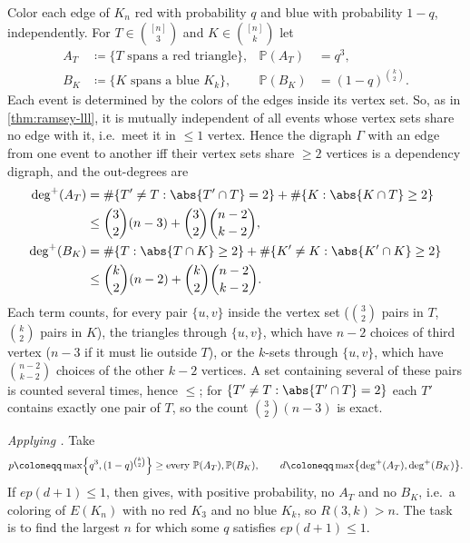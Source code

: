 Color each edge of \(K_{n}\) red with probability \(q\) and blue with probability \(1-q\), independently. For \(T \in \binom{[n]}{3}\) and \(K \in \binom{[n]}{k}\) let
\[
    \begin{aligned}
        A_{T} &\coloneqq \{ T \text{ spans a red triangle} \}, & \mathbb{P}(A_{T}) &= q^{3}, \\
        B_{K} &\coloneqq \{ K \text{ spans a blue } K_{k} \}, & \mathbb{P}(B_{K}) &= (1-q)^{\binom{k}{2}} .
    \end{aligned}
\]
Each event is determined by the colors of the edges inside its vertex set. So, as in \autoref{thm:ramsey-lll}, it is mutually independent of all events whose vertex sets share no edge with it, i.e.\ meet it in \(\le 1\) vertex. Hence the digraph \(\Gamma\) with an edge from one event to another iff their vertex sets share \(\ge 2\) vertices is a dependency digraph, and the out-degrees are
\[
    \begin{aligned}
        \deg^{+}(A_{T}) &= \# \{ T' \ne T : \abs{T' \cap T} = 2 \} + \# \{ K : \abs{K \cap T} \ge 2 \} \\
        &\le \binom{3}{2} (n-3) + \binom{3}{2} \binom{n-2}{k-2}, \\
        \deg^{+}(B_{K}) &= \# \{ T : \abs{T \cap K} \ge 2 \} + \# \{ K' \ne K : \abs{K' \cap K} \ge 2 \} \\
        &\le \binom{k}{2} (n-2) + \binom{k}{2} \binom{n-2}{k-2} .
    \end{aligned}
\]
Each term counts, for every pair \(\{u, v\}\) inside the vertex set (\(\binom{3}{2}\) pairs in \(T\), \(\binom{k}{2}\) pairs in \(K\)), the triangles through \(\{u, v\}\), which have \(n-2\) choices of third vertex (\(n-3\) if it must lie outside \(T\)), or the \(k\)-sets through \(\{u, v\}\), which have \(\binom{n-2}{k-2}\) choices of the other \(k-2\) vertices. A set containing several of these pairs is counted several times, hence \(\le\); for \(\{ T' \ne T : \abs{T' \cap T} = 2 \}\) each \(T'\) contains exactly one pair of \(T\), so the count \(\binom{3}{2}(n-3)\) is exact.

\emph{Applying .} Take
\[
    p \coloneqq \max \Bigl\{ q^{3}, (1-q)^{\binom{k}{2}} \Bigr\} \ge \text{every } \mathbb{P}(A_{T}), \mathbb{P}(B_{K}),
    \qquad
    d \coloneqq \max \bigl\{ \deg^{+}(A_{T}), \deg^{+}(B_{K}) \bigr\} .
\]
If \(e p (d+1) \le 1\), then  gives, with positive probability, no \(A_{T}\) and no \(B_{K}\), i.e.\ a coloring of \(E(K_{n})\) with no red \(K_{3}\) and no blue \(K_{k}\), so \(R(3,k) > n\). The task is to find the largest \(n\) for which some \(q\) satisfies \(e p (d+1) \le 1\).

